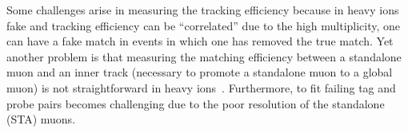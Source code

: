 Some challenges arise in measuring the tracking efficiency because in heavy ions fake and
tracking efficiency can be ``correlated'' due to the high
multiplicity, \ie one can have a fake match in events in which one has
removed the true match. 
Yet another problem is that measuring
the matching efficiency %
between a standalone muon and an inner track (necessary to promote a standalone
muon to a global muon) is not straightforward in heavy ions~\cite{CMS_AN_2011_062}. 
Furthermore, to fit failing tag and probe pairs becomes challenging due to the poor
resolution of the standalone (STA) muons.
%
%
%
